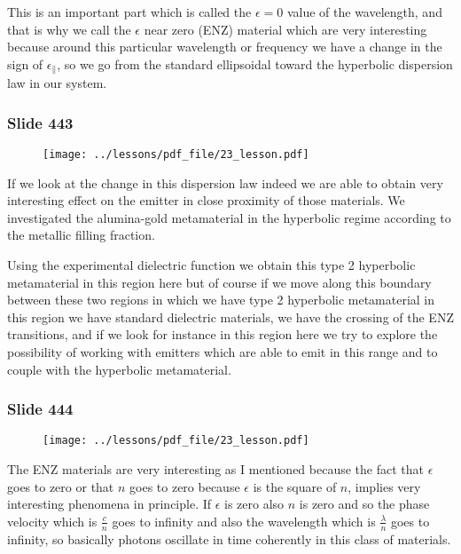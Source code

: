 \documentclass[../main/main.tex]{subfiles}
\begin{document}
This is an important part which is called the $\epsilon = 0$ value of the wavelength, and that is why we call the $\epsilon$ near zero (ENZ) material which are very interesting because around this particular wavelength or frequency we have a change in the sign of $\epsilon_{\parallel}$, so we go from the standard ellipsoidal toward the hyperbolic dispersion law in our system.

\newpage

\subsubsection{Slide 443}

\begin{figure}[h!]
\centering
\texttt{[image: ../lessons/pdf\_file/23\_lesson.pdf]}
\end{figure}

If we look at the change in this dispersion law indeed we are able to obtain very interesting effect on the emitter in close proximity of those materials. We investigated the alumina-gold metamaterial in the hyperbolic regime according to the metallic filling fraction.

Using the experimental dielectric function we obtain this type 2 hyperbolic metamaterial in this region here but of course if we move along this boundary between these two regions in which we have type 2 hyperbolic metamaterial in this region we have standard dielectric materials, we have the crossing of the ENZ transitions, and if we look for instance in this region here we try to explore the possibility of working with emitters which are able to emit in this range and to couple with the hyperbolic metamaterial.

\newpage

\subsubsection{Slide 444}

\begin{figure}[h!]
\centering
\texttt{[image: ../lessons/pdf\_file/23\_lesson.pdf]}
\end{figure}

The ENZ materials are very interesting as I mentioned because the fact that $\epsilon$ goes to zero or that $n$ goes to zero because $\epsilon$ is the square of $n$, implies very interesting phenomena in principle. If $\epsilon$ is zero also $n$ is zero and so the phase velocity which is $\frac{c}{n}$ goes to infinity and also the wavelength which is $\frac{\lambda}{n}$ goes to infinity, so basically photons oscillate in time coherently in this class of materials.
\end{document}

